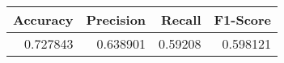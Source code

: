 \begin{tabular}{rrrr}
\toprule
 Accuracy &  Precision &  Recall &  F1-Score \\
\midrule
 0.727843 &   0.638901 & 0.59208 &  0.598121 \\
\bottomrule
\end{tabular}
